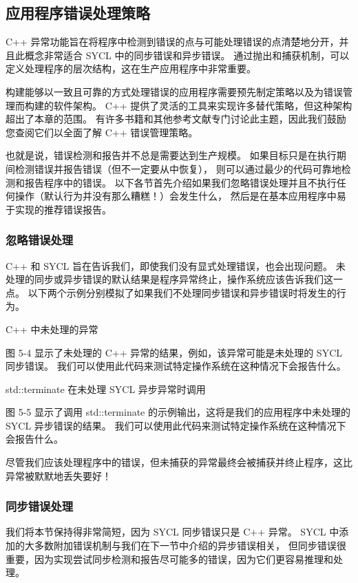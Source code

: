 \subsection{应用程序错误处理策略}
C++ 异常功能旨在将程序中检测到错误的点与可能处理错误的点清楚地分开，并且此概念非常适合 SYCL 中的同步错误和异步错误。 
通过抛出和捕获机制，可以定义处理程序的层次结构，这在生产应用程序中非常重要。

构建能够以一致且可靠的方式处理错误的应用程序需要预先制定策略以及为错误管理而构建的软件架构。 
C++ 提供了灵活的工具来实现许多替代策略，但这种架构超出了本章的范围。 
有许多书籍和其他参考文献专门讨论此主题，因此我们鼓励您查阅它们以全面了解 C++ 错误管理策略。

也就是说，错误检测和报告并不总是需要达到生产规模。 如果目标只是在执行期间检测错误并报告错误（但不一定要从中恢复），
则可以通过最少的代码可靠地检测和报告程序中的错误。 
以下各节首先介绍如果我们忽略错误处理并且不执行任何操作（默认行为并没有那么糟糕！）会发生什么，
然后是在基本应用程序中易于实现的推荐错误报告。

\subsubsection{忽略错误处理}
C++ 和 SYCL 旨在告诉我们，即使我们没有显式处理错误，也会出现问题。 
未处理的同步或异步错误的默认结果是程序异常终止，操作系统应该告诉我们这一点。 
以下两个示例分别模拟了如果我们不处理同步错误和异步错误时将发生的行为。

{\color{red} C++ 中未处理的异常}

图 5-4 显示了未处理的 C++ 异常的结果，例如，该异常可能是未处理的 SYCL 同步错误。 
我们可以使用此代码来测试特定操作系统在这种情况下会报告什么。

{\color{red} std::terminate 在未处理 SYCL 异步异常时调用}

图 5-5 显示了调用 std::terminate 的示例输出，这将是我们的应用程序中未处理的 SYCL 异步错误的结果。 
我们可以使用此代码来测试特定操作系统在这种情况下会报告什么。

尽管我们应该处理程序中的错误，但未捕获的异常最终会被捕获并终止程序，这比异常被默默地丢失要好！

\subsubsection{同步错误处理}
我们将本节保持得非常简短，因为 SYCL 同步错误只是 C++ 异常。 
SYCL 中添加的大多数附加错误机制与我们在下一节中介绍的异步错误相关，
但同步错误很重要，因为实现尝试同步检测和报告尽可能多的错误，因为它们更容易推理和处理。

